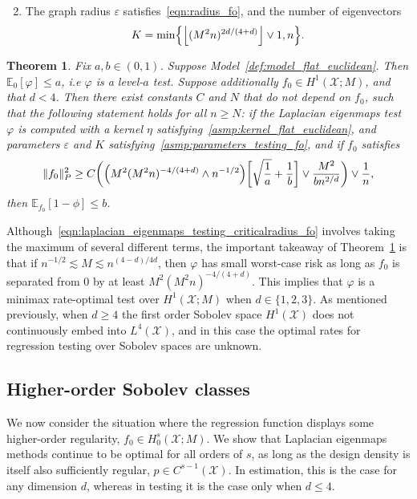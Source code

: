 \documentclass[aos]{imsart}
\theoremstyle{plain}
\newtheorem{theorem}{Theorem}
\theoremstyle{definition}
\theoremstyle{remark}
\newcommand{\Ebb}{\mathbb{E}}
\newcommand{\mc}[1]{\mathcal{#1}}
\newcommand{\floor}[1]{\left\lfloor #1 \right\rfloor}
\newcommand{\1}{\mathbf{1}}
\begin{document}
\begin{enumerate}[label=(P\arabic*)]
	\setcounter{enumi}{1}
	\item 
	\label{asmp:parameters_testing_fo}
	The graph radius $\varepsilon$ satisfies~\eqref{eqn:radius_fo}, and the number of eigenvectors 
	\begin{equation}
	\label{eqn:eigenvector_testing_fo}
	K = \min\Bigl\{\floor{(M^2n)^{2d/(4 + d)}} \vee 1, n\Bigr\}.
	\end{equation}
\end{enumerate}
\begin{theorem}
	\label{thm:laplacian_eigenmaps_testing_fo}
	Fix $a,b \in (0,1)$. Suppose Model~\ref{def:model_flat_euclidean}. Then $\mathbb{E}_0[\varphi] \leq a$, i.e $\varphi$ is a level-$a$ test. Suppose additionally $f_0 \in H^1(\mc{X};M)$, and that $d < 4$. Then there exist constants $C$ and $N$ that do not depend on $f_0$, such that the following statement holds for all $n \geq N$: if the Laplacian eigenmaps test $\varphi$ is computed with a kernel $\eta$ satisfying~\ref{asmp:kernel_flat_euclidean}, and parameters $\varepsilon$ and $K$ satisfying~\ref{asmp:parameters_testing_fo}, and if $f_0$ satisfies
	\begin{equation}
	\label{eqn:laplacian_eigenmaps_testing_criticalradius_fo}
	\|f_0\|_P^2 \geq C\biggl(\Bigl(M^2(M^2n)^{-4/(4 + d) } \wedge n^{-1/2}\Bigr)\biggl[\sqrt{\frac{1}{a}} + \frac{1}{b}\biggr] \vee \frac{M^2}{b n^{2/d}} \biggr) \vee \frac{1}{n},
	\end{equation}
	then $\Ebb_{f_0}[1 - \phi] \leq b$.
\end{theorem}
Although~\eqref{eqn:laplacian_eigenmaps_testing_criticalradius_fo} involves taking the maximum of several different terms, the important takeaway of Theorem~\ref{thm:laplacian_eigenmaps_testing_fo} is that if $n^{-1/2} \lesssim M \lesssim n^{(4 - d)/4d}$, then $\varphi$ has small worst-case risk as long as $f_0$ is separated from $0$ by at least $M^2(M^2n)^{-4/(4 + d)}$. This implies that $\varphi$ is a minimax rate-optimal test over $H^1(\mc{X};M)$ when $d \in \{1,2,3\}$. As mentioned previously, when $d \geq 4$ the first order Sobolev space $H^1(\mc{X})$ does not continuously embed into $L^4(\mc{X})$, and in this case the optimal rates for regression testing over Sobolev spaces are unknown.

\subsection{Higher-order Sobolev classes}
\label{sec:higher_order_sobolev_classes}
We now consider the situation where the regression function displays some higher-order regularity, $f_0 \in H_0^s(\mc{X};M)$. We show that Laplacian eigenmaps methods continue to be optimal for all orders of $s$, as long as the design density is itself also sufficiently regular, $p \in C^{s - 1}(\mc{X})$. In estimation, this is the case for any dimension $d$, whereas in testing it is the case only when $d \leq 4$. 
\end{document}
